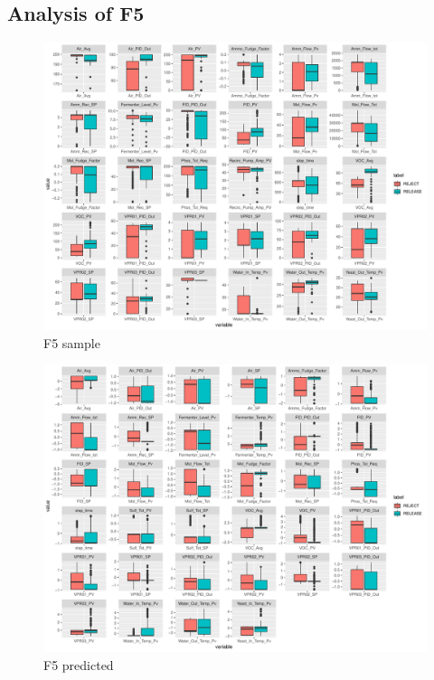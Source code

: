 \subsection{Analysis of F5}
\begin{figure}
    \centering
    \includegraphics[width=1.0\textwidth]{plots/f5-sample.pdf}
    \caption{F5 sample}
    \label{fig:f5_sample}
\end{figure}

\begin{figure}
    \centering
    \includegraphics[width=1.0\textwidth]{plots/f5-predicted.pdf}
    \caption{F5 predicted}
    \label{fig:f5_predicted}
\end{figure}
